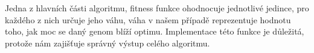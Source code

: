 \documentclass{article}
\begin{document}
    Jedna z hlavních části algoritmu, fitness funkce ohodnocuje jednotlivé jedince, pro každého z nich určuje jeho váhu, váha v našem případě reprezentuje hodnotu toho, jak
    moc se daný genom blíží optimu. Implementace této funkce je důležitá, protože nám zajišťuje správný výstup celého algoritmu.

    




\end{document}
